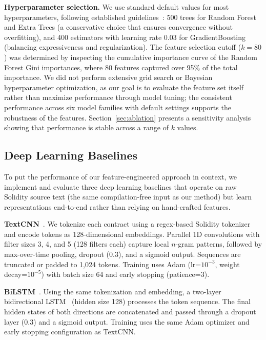 \documentclass[11pt,a4paper]{article}
\begin{document}
\textbf{Hyperparameter selection.}
We use standard default values for most hyperparameters, following established guidelines~\cite{probst2019tunability}: 500 trees for Random Forest and Extra Trees (a conservative choice that ensures convergence without overfitting), and 400 estimators with learning rate 0.03 for GradientBoosting (balancing expressiveness and regularization).
The feature selection cutoff ($k = 80$) was determined by inspecting the cumulative importance curve of the Random Forest Gini importances, where 80 features captured over 95\% of the total importance.
We did not perform extensive grid search or Bayesian hyperparameter optimization, as our goal is to evaluate the feature set itself rather than maximize performance through model tuning; the consistent performance across six model families with default settings supports the robustness of the features.
Section~\ref{sec:ablation} presents a sensitivity analysis showing that performance is stable across a range of $k$ values.

\subsection{Deep Learning Baselines}
\label{sec:dl_baselines}

To put the performance of our feature-engineered approach in context, we implement and evaluate three deep learning baselines that operate on raw Solidity source text (the same compilation-free input as our method) but learn representations end-to-end rather than relying on hand-crafted features.

\textbf{TextCNN}~\cite{kim2014convolutional}.
We tokenize each contract using a regex-based Solidity tokenizer and encode tokens as 128-dimensional embeddings.
Parallel 1D convolutions with filter sizes 3, 4, and 5 (128 filters each) capture local $n$-gram patterns, followed by max-over-time pooling, dropout (0.3), and a sigmoid output.
Sequences are truncated or padded to 1,024 tokens.
Training uses Adam (lr=$10^{-3}$, weight decay=$10^{-5}$) with batch size 64 and early stopping (patience=3).

\textbf{BiLSTM}~\cite{schuster1997bidirectional}.
Using the same tokenization and embedding, a two-layer bidirectional LSTM~\cite{hochreiter1997long} (hidden size 128) processes the token sequence.
The final hidden states of both directions are concatenated and passed through a dropout layer (0.3) and a sigmoid output.
Training uses the same Adam optimizer and early stopping configuration as TextCNN.
\end{document}
